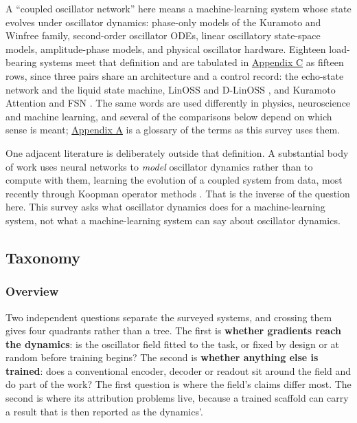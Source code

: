 \documentclass[a4paper,fleqn]{cas-sc}
\begin{document}
A ``coupled oscillator network'' here means a machine-learning system
whose state evolves under oscillator dynamics: phase-only models of the
Kuramoto and Winfree family, second-order oscillator ODEs, linear
oscillatory state-space models, amplitude-phase models, and physical
oscillator hardware. Eighteen load-bearing systems meet that definition
and are tabulated in \hyperref[sec-C]{Appendix C} as fifteen rows, since
three pairs share an architecture and a control record: the echo-state
network and the liquid state machine, LinOSS \citep{rusch2025} and
D-LinOSS \citep{d-linoss}, and Kuramoto Attention
\citep{kuramoto-attention} and FSN \citep{nunley2026}. The same words
are used differently in physics, neuroscience and machine learning, and
several of the comparisons below depend on which sense is meant;
\hyperref[sec-A]{Appendix A} is a glossary of the terms as this survey
uses them.

One adjacent literature is deliberately outside that definition. A
substantial body of work uses neural networks to \emph{model} oscillator
dynamics rather than to compute with them, learning the evolution of a
coupled system from data, most recently through Koopman operator methods
\citep{sasikumar2026}. That is the inverse of the question here. This
survey asks what oscillator dynamics does for a machine-learning system,
not what a machine-learning system can say about oscillator dynamics.

\subsection{Taxonomy}\label{sec-2-2}

\subsubsection{Overview}\label{sec-2-2-1}

Two independent questions separate the surveyed systems, and crossing
them gives four quadrants rather than a tree. The first is
\textbf{whether gradients reach the dynamics}: is the oscillator field
fitted to the task, or fixed by design or at random before training
begins? The second is \textbf{whether anything else is trained}: does a
conventional encoder, decoder or readout sit around the field and do
part of the work? The first question is where the field's claims differ
most. The second is where its attribution problems live, because a
trained scaffold can carry a result that is then reported as the
dynamics'.
\end{document}
